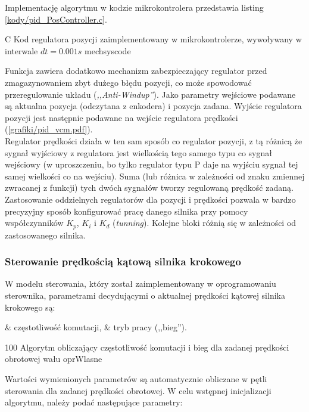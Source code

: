 Implementację algorytmu w kodzie mikrokontrolera przedstawia listing \ref{kody/pid_PosController.c}.

	{C}
	{Kod regulatora pozycji zaimplementowany w  mikrokontrolerze, wywoływany w interwale $ dt = 0.001 s $}
	{mechsyscode}
	
Funkcja zawiera dodatkowo mechanizm zabezpieczający regulator przed zmagazynowaniem zbyt dużego błędu pozycji, co może spowodować przeregulowanie układu ({\it ,,Anti-Windup''}). Jako parametry wejściowe podawane są aktualna pozycja (odczytana z enkodera) i pozycja zadana. Wyjście regulatora pozycji jest następnie podawane na wejście regulatora prędkości (\ref{grafiki/pid_vcm.pdf}). \\

Regulator prędkości działa w ten sam sposób co regulator pozycji, z tą różnicą że sygnał wyjściowy z regulatora jest wielkością tego samego typu co sygnał wejściowy (w uproszczeniu, bo tylko regulator typu P daje na wyjściu sygnał tej samej wielkości co na wejściu). Suma (lub różnica w zależności od znaku zmiennej zwracanej z funkcji) tych dwóch sygnałów tworzy regulowaną prędkość zadaną. Zastosowanie oddzielnych regulatorów dla pozycji i prędkości pozwala w bardzo precyzyjny sposób konfigurować pracę danego silnika przy pomocy współczynników $ K_p $, $ K_i $ i $ K_d $ ({\it tunning}). Kolejne bloki różnią się w zależności od zastosowanego silnika.

\subsubsection{Sterowanie prędkością kątową silnika krokowego}

W modelu sterowania, który został zaimplementowany w oprogramowaniu sterownika, parametrami decydującymi o aktualnej prędkości kątowej silnika krokowego są:

\begin{easylist}
	& częstotliwość komutacji,
	& tryb pracy (,,bieg'').
\end{easylist} 

	{100}
	{Algorytm obliczający częstotliwość komutacji i bieg dla zadanej prędkości obrotowej wału}
	{oprWlasne}

Wartości wymienionych parametrów są automatycznie obliczane w pętli sterowania dla zadanej prędkości obrotowej. W celu  wstępnej inicjalizacji algorytmu, należy podać następujące parametry:

